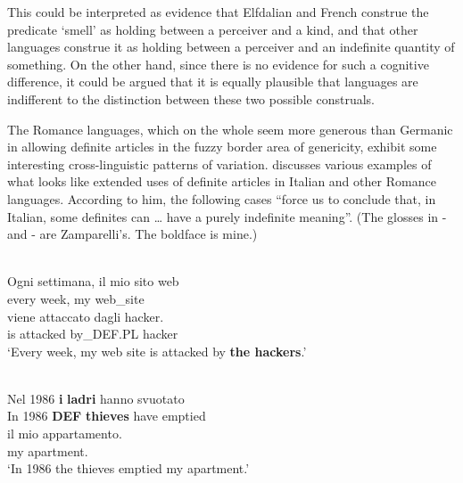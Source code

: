 \ea \label{} 
\z 
\z

This could be interpreted as evidence that Elfdalian and French construe the predicate ‘smell’ as holding between a perceiver and a kind, and that other languages construe it as holding between a perceiver and an indefinite quantity of something. On the other hand, since there is no evidence for such a cognitive difference, it could be argued that it is equally plausible that languages are indifferent to the distinction between these two possible construals. 

The Romance languages, which on the whole seem more generous than Germanic in allowing definite articles in the fuzzy border area of genericity, exhibit some interesting cross-linguistic patterns of variation. \citet{Zamparelli2002} discusses various examples of what looks like extended uses of definite articles in Italian and other Romance languages. According to him, the following cases “force us to conclude that, in Italian, some definites can … have a purely indefinite meaning”. (The glosses in - and - are Zamparelli’s. The boldface is mine.)

\ea \label{} 
\\
\gll Ogni  settimana,  il mio  sito web\\
every  week,  my  web\_site\\
\gll viene  attaccato  dagli  hacker.\\
is  attacked  by\_DEF.PL  hacker\\
\glt ‘Every week, my web site is attacked by \textbf{the hackers}.’

\z

\ea \label{} 
\\
\gll Nel  1986  \textbf{i} \textbf{ladri} hanno  svuotato\\
In  1986  \textbf{DEF} \textbf{thieves} have  emptied\\
\gll il mio  appartamento.\\
my  apartment.\\
\glt ‘In 1986 the thieves emptied my apartment.’

